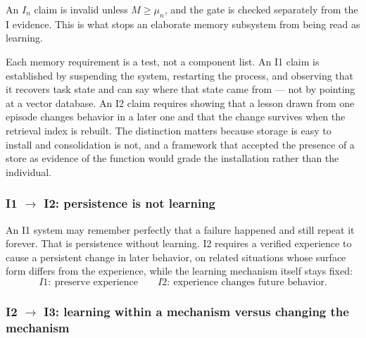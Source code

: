 An $I_n$ claim is invalid unless $M \ge \mu_n$, and the gate is checked separately from the I evidence. This is what stops an elaborate memory subsystem from being read as learning.

Each memory requirement is a test, not a component list. An I1 claim is established by suspending the system, restarting the process, and observing that it recovers task state and can say where that state came from --- not by pointing at a vector database. An I2 claim requires showing that a lesson drawn from one episode changes behavior in a later one and that the change survives when the retrieval index is rebuilt. The distinction matters because storage is easy to install and consolidation is not, and a framework that accepted the presence of a store as evidence of the function would grade the installation rather than the individual.

\subsubsection{I1 $\to$ I2: persistence is not learning}

An I1 system may remember perfectly that a failure happened and still repeat it forever. That is persistence without learning. I2 requires a verified experience to cause a persistent change in later behavior, on related situations whose surface form differs from the experience, while the learning mechanism itself stays fixed:
\begin{equation}
I1:\ \text{preserve experience} \qquad I2:\ \text{experience changes future behavior}.
\end{equation}

\subsubsection{I2 $\to$ I3: learning within a mechanism versus changing the mechanism}\label{sec:theta}

